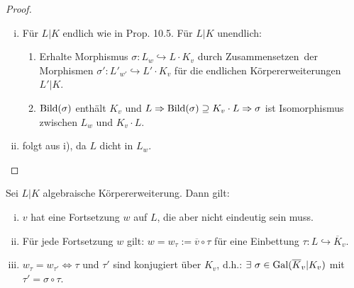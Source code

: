 \begin{proof}
\begin{enumerate}[i)]
\item Für $L|K$ endlich wie in Prop. 10.5. Für $L|K$ unendlich:
\begin{enumerate}[(1)]
\item Erhalte Morphismus $\sigma: L_w \hookrightarrow L \cdot K_v$ durch \glqq Zusammensetzen\grqq \ der Morphismen $\sigma': L'_{w'} \hookrightarrow L' \cdot K_v$ für die endlichen Körpererweiterungen $L'|K$.
\item $\operatorname{Bild}(\sigma)$ enthält $K_v$ und $L \Rightarrow \operatorname{Bild}(\sigma) \supseteq K_v \cdot L \Rightarrow \sigma$ ist Isomorphismus zwischen $L_w$ und $K_v \cdot L$.
\end{enumerate}
\item folgt aus i), da $L$ dicht in $L_w$.
\end{enumerate}
\end{proof}

\begin{Satz}
Sei $L|K$ algebraische Körpererweiterung. Dann gilt:
\begin{enumerate}[i)]
\item $v$ hat eine Fortsetzung $w$ auf $L$, die aber nicht eindeutig sein muss.
\item Für jede Fortsetzung $w$ gilt: $w=w_\tau:=\overline{v} \circ \tau$ für eine Einbettung $\tau: L \hookrightarrow \overline{K}_v$.
\item $w_\tau = w_{\tau'} \iff \tau$ und $\tau'$ sind konjugiert über $K_v$, d.h.: $\exists \ \sigma \in \operatorname{Gal}(\overline{K}_v | K_v)$ mit $\tau'=\sigma \circ \tau$.
\end{enumerate}
\end{Satz}

